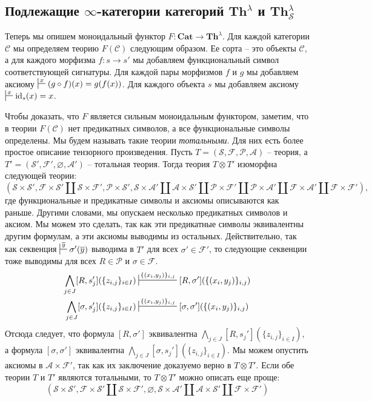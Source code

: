 \documentclass[reqno]{amsart}
\theoremstyle{definition}
\theoremstyle{remark}
\newcommand{\bcat}[1]{\mathbf{#1}}
\newcommand{\cat}[1]{\mathcal{#1}}
\renewcommand{\C}{\cat{C}}
\newcommand{\fs}[1]{\mathrm{#1}}
\newcommand{\Th}{\bcat{Th}}
\newcommand{\Cat}{\bcat{Cat}}
\begin{document}
\subsection{Подлежащие $\infty$-категории категорий $\Th^\lambda$ и $\Th^\lambda_\mathcal{S}$}

Теперь мы опишем моноидальный функтор $F : \Cat \to \Th^\lambda$.
Для каждой категории $\C$ мы определяем теорию $F(\C)$ следующим образом.
Ее сорта -- это объекты $\C$, а для каждого морфизма $f : s \to s'$ мы добавляем функциональный символ соответствующей сигнатуры.
Для каждой пары морфизмов $f$ и $g$ мы добавляем аксиому $\sststile{}{x} (g \circ f)(x) = g(f(x))$.
Для каждого объекта $s$ мы добавляем аксиому $\sststile{}{x} \fs{id}_s(x) = x$.

Чтобы доказать, что $F$ является сильным моноидальным функтором, заметим, что в теории $F(\C)$ нет предикатных символов, а все функциональные символы определены.
Мы будем называть такие теории \emph{тотальными}.
Для них есть более простое описание тензорного произведения.
Пусть $T = (\mathcal{S},\mathcal{F},\mathcal{P},\mathcal{A})$ -- теория, а $T' = (\mathcal{S}',\mathcal{F}',\varnothing,\mathcal{A}')$ -- тотальная теория.
Тогда теория $T \otimes T'$ изоморфна следующей теории:
\[ (\mathcal{S} \times \mathcal{S}', \mathcal{F} \times \mathcal{S}' \amalg \mathcal{S} \times \mathcal{F}', \mathcal{P} \times \mathcal{S}', \mathcal{S} \times \mathcal{A}' \amalg \mathcal{A} \times \mathcal{S}' \amalg \mathcal{P} \times \mathcal{F}' \amalg \mathcal{P} \times \mathcal{A}' \amalg \mathcal{F} \times \mathcal{A}' \amalg \mathcal{F} \times \mathcal{F}'), \]
где функциональные и предикатные символы и аксиомы описываются как раньше.
Другими словами, мы опускаем несколько предикатных символов и аксиом.
Мы можем это сделать, так как эти предикатные символы эквивалентны другим формулам, а эти аксиомы выводимы из остальных.
Действительно, так как секвенция $\sststile{}{\overline{y}} \sigma'(\overline{y})$ выводима в $T'$ для всех $\sigma' \in \mathcal{F}'$, то следующие секвенции тоже выводимы для всех $R \in \mathcal{P}$ и $\sigma \in \mathcal{F}$.
\begin{align*}
\bigwedge_{j \in J} [R,s_j'](\{ z_{i,j} \}_{i \in I}) & \sststile{}{\{ (x_i,y_j) \}_{i,j}} [R,\sigma'](\{ (x_i,y_j) \}_{i,j}) \\
\bigwedge_{j \in J} [\sigma,s_j'](\{ z_{i,j} \}_{i \in I}) & \sststile{}{\{ (x_i,y_j) \}_{i,j}} [\sigma,\sigma'](\{ (x_i,y_j) \}_{i,j})
\end{align*}
Отсюда следует, что формула $[R,\sigma']$ эквивалентна $\bigwedge_{j \in J} [R,s_j'](\{ z_{i,j} \}_{i \in I})$, а формула $[\sigma,\sigma']$ эквивалентна $\bigwedge_{j \in J} [\sigma,s_j'](\{ z_{i,j} \}_{i \in I})$.
Мы можем опустить аксиомы в $\mathcal{A} \times \mathcal{F}'$, так как их заключение доказуемо верно в $T \otimes T'$.
Если обе теории $T$ и $T'$ являются тотальными, то $T \otimes T'$ можно описать еще проще:
\[ (\mathcal{S} \times \mathcal{S}', \mathcal{F} \times \mathcal{S}' \amalg \mathcal{S} \times \mathcal{F}', \varnothing, \mathcal{S} \times \mathcal{A}' \amalg \mathcal{A} \times \mathcal{S}' \amalg \mathcal{F} \times \mathcal{F}') \]
\end{document}
